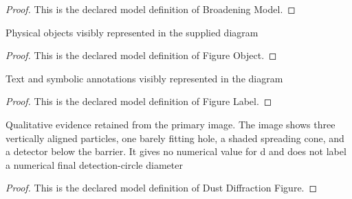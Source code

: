\begin{proof}
  This is the declared model definition of Broadening Model.
\end{proof}
\begin{definition}
  \label{def:physics:phyx-mini-0655:phyxminiproblems-problemphyxmini0655-figureobject}
  Physical objects visibly represented in the supplied diagram
\end{definition}
\begin{proof}
  This is the declared model definition of Figure Object.
\end{proof}
\begin{definition}
  \label{def:physics:phyx-mini-0655:phyxminiproblems-problemphyxmini0655-figurelabel}
  Text and symbolic annotations visibly represented in the diagram
\end{definition}
\begin{proof}
  This is the declared model definition of Figure Label.
\end{proof}
\begin{definition}
  \label{def:physics:phyx-mini-0655:phyxminiproblems-problemphyxmini0655-dustdiffractionfigure}
  Qualitative evidence retained from the primary image. The image shows three vertically aligned particles, one barely fitting hole, a shaded spreading cone, and a detector below the barrier. It gives no numerical value for d and does not label a numerical final detection-circle diameter
\end{definition}
\begin{proof}
  This is the declared model definition of Dust Diffraction Figure.
\end{proof}
